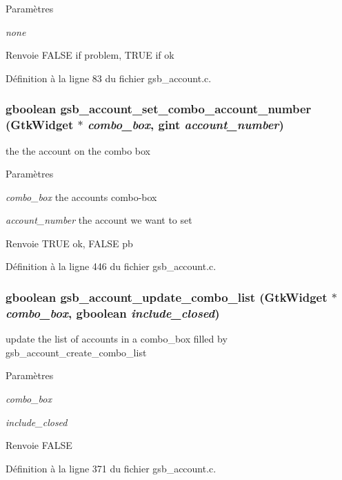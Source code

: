 \begin{DoxyParams}{Paramètres}
\item[{\em none}]\end{DoxyParams}
\begin{DoxyReturn}{Renvoie}
FALSE if problem, TRUE if ok 
\end{DoxyReturn}


Définition à la ligne 83 du fichier gsb\_\-account.c.

\subsubsection[{gsb\_\-account\_\-set\_\-combo\_\-account\_\-number}]{\setlength{\rightskip}{0pt plus 5cm}gboolean gsb\_\-account\_\-set\_\-combo\_\-account\_\-number (GtkWidget $\ast$ {\em combo\_\-box}, \/  gint {\em account\_\-number})}\label{gsb__account_8h_a7e2153dff1b7f36dd035c01a0e6bf25a}
the the account on the combo box


\begin{DoxyParams}{Paramètres}
\item[{\em combo\_\-box}]the accounts combo-\/box \item[{\em account\_\-number}]the account we want to set\end{DoxyParams}
\begin{DoxyReturn}{Renvoie}
TRUE ok, FALSE pb 
\end{DoxyReturn}


Définition à la ligne 446 du fichier gsb\_\-account.c.

\subsubsection[{gsb\_\-account\_\-update\_\-combo\_\-list}]{\setlength{\rightskip}{0pt plus 5cm}gboolean gsb\_\-account\_\-update\_\-combo\_\-list (GtkWidget $\ast$ {\em combo\_\-box}, \/  gboolean {\em include\_\-closed})}\label{gsb__account_8h_a62f0c33eae4fe6957f7668da14e47020}
update the list of accounts in a combo\_\-box filled by gsb\_\-account\_\-create\_\-combo\_\-list


\begin{DoxyParams}{Paramètres}
\item[{\em combo\_\-box}]\item[{\em include\_\-closed}]\end{DoxyParams}
\begin{DoxyReturn}{Renvoie}
FALSE 
\end{DoxyReturn}


Définition à la ligne 371 du fichier gsb\_\-account.c.

